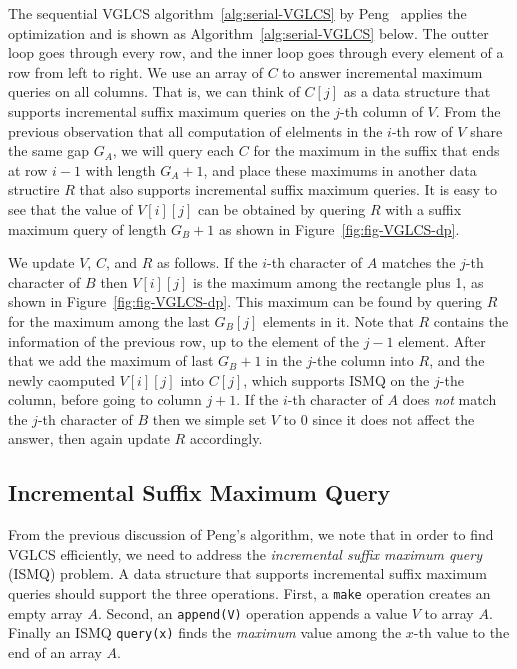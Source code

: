 The sequential VGLCS algorithm~\ref{alg:serial-VGLCS} by
Peng~\cite{Peng2011TheLC} applies the optimization and is shown as
Algorithm~\ref{alg:serial-VGLCS} below.  The outter loop goes through
every row, and the inner loop goes through every element of a row from
left to right.  We use an array of $C$ to answer incremental maximum
queries on all columns.  That is, we can think of $C[j]$ as a data
structure that supports incremental suffix maximum queries on the
$j$-th column of $V$.  From the previous observation that all
computation of elelments in the $i$-th row of $V$ share the same gap
$G_A$, we will query each $C$ for the maximum in the suffix that ends
at row $i-1$ with length $G_A + 1$, and place these maximums in
another data structire $R$ that also supports incremental suffix
maximum queries.  It is easy to see that the value of $V[i][j]$ can be
obtained by quering $R$ with a suffix maximum query of length $G_B +
1$ as shown in Figure~\ref{fig:fig-VGLCS-dp}.

We update $V$, $C$, and $R$ as follows.  If the $i$-th character of
$A$ matches the $j$-th character of $B$ then $V[i][j]$ is the maximum
among the rectangle plus 1, as shown in Figure~\ref{fig:fig-VGLCS-dp}.
This maximum can be found by quering $R$ for the maximum among the
last $G_B[j]$ elements in it.  Note that $R$ contains the information
of the previous row, up to the element of the $j-1$ element.  After
that we add the maximum of last $G_B + 1$ in the $j$-the column into
$R$, and the newly caomputed $V[i][j]$ into $C[j]$, which supports
ISMQ on the $j$-the column, before going to column $j + 1$.  If the
$i$-th character of $A$ does {\em not} match the $j$-th character of
$B$ then we simple set $V$ to 0 since it does not affect the answer,
then again update $R$ accordingly.
 



\subsection{Incremental Suffix Maximum Query}

From the previous discussion of Peng's algorithm, we note that in
order to find VGLCS efficiently, we need to address the {\em
  incremental suffix maximum query} (ISMQ) problem.  A data structure
that supports incremental suffix maximum queries should support the
three operations.  First, a {\tt make} operation creates an empty
array $A$. Second, an {\tt append(V)} operation appends a value $V$ to
array $A$. Finally an ISMQ {\tt query(x)} finds the {\em maximum}
value among the $x$-th value to the end of an array $A$.

